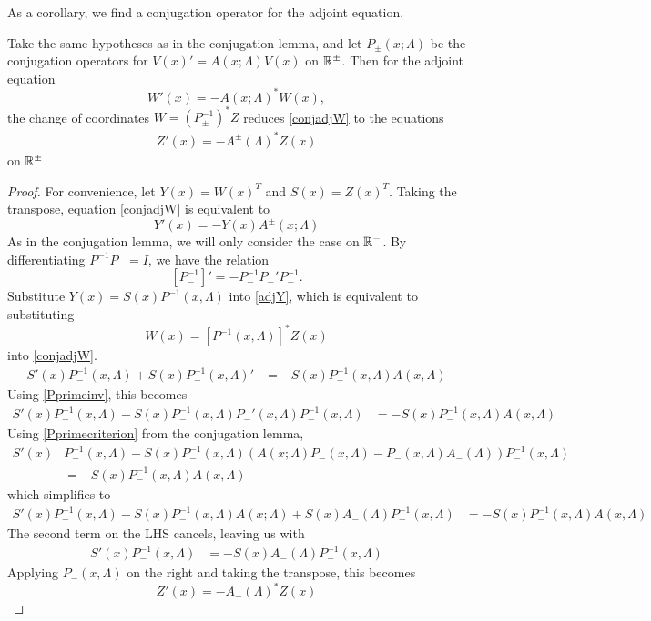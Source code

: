 \documentclass[thesis.tex]{subfiles}
\begin{document}
As a corollary, we find a conjugation operator for the adjoint equation.

\begin{corollary}\label{corr:adjconj}
Take the same hypotheses as in the conjugation lemma, and let $P_\pm(x; \Lambda)$ be the conjugation operators for $V(x)' = A(x; \Lambda) V(x)$ on $\mathbb{R}^\pm$. Then for the adjoint equation
\begin{equation}\label{conjadjW}
W'(x) = -A(x; \Lambda)^* W(x),
\end{equation}
the change of coordinates $W = (P_\pm^{-1})^* Z$ reduces \cref{conjadjW} to the equations
\begin{align}\label{ZconjW}
Z'(x) = -A^\pm(\Lambda)^* Z(x) 
\end{align}
on $\mathbb{R}^\pm$.
\begin{proof}
For convenience, let $Y(x) = W(x)^T$ and $S(x) = Z(x)^T$. Taking the transpose, equation \cref{conjadjW} is equivalent to
\begin{equation}\label{adjY}
Y'(x) = -Y(x)A^\pm(x; \Lambda) 
\end{equation}
As in the conjugation lemma, we will only consider the case on $\mathbb{R}^-$. By differentiating $P_-^{-1} P_- = I$, we have the relation
\begin{equation}\label{Pprimeinv}
[P_-^{-1}]' = -P_-^{-1} P_-' P_-^{-1}.
\end{equation}
Substitute $Y(x) = S(x) P^{-1}(x, \Lambda)$ into \cref{adjY}, which is equivalent to substituting 
\[
W(x) = [P^{-1}(x, \Lambda)]^* Z(x)
\] 
into \cref{conjadjW}.
\begin{align*}
S'(x) P_-^{-1}(x, \Lambda) + S(x) P_-^{-1}(x, \Lambda)'
&= -S(x) P_-^{-1}(x, \Lambda) A(x, \Lambda)
\end{align*}
Using \cref{Pprimeinv}, this becomes
\begin{align*}
S'(x) P_-^{-1}(x, \Lambda) - S(x) P_-^{-1}(x, \Lambda) P_-'(x, \Lambda) P_-^{-1}(x, \Lambda)
&= -S(x) P_-^{-1}(x, \Lambda) A(x, \Lambda)
\end{align*}
Using \cref{Pprimecriterion} from the conjugation lemma, 
\begin{align*}
S'(x) &P_-^{-1}(x, \Lambda) - S(x) P_-^{-1}(x, \Lambda) \left(A(x; \Lambda)P_-(x, \Lambda) - P_-(x, \Lambda) A_-(\Lambda)\right) P_-^{-1}(x, \Lambda) \\
&= -S(x) P_-^{-1}(x, \Lambda) A(x, \Lambda)
\end{align*}
which simplifies to
\begin{align*}
S'(x) P_-^{-1}(x, \Lambda) - S(x) P_-^{-1}(x, \Lambda) A(x; \Lambda) + S(x) A_-(\Lambda) P_-^{-1}(x, \Lambda)
&= -S(x) P_-^{-1}(x, \Lambda) A(x, \Lambda)
\end{align*}
The second term on the LHS cancels, leaving us with
\begin{align*}
S'(x) P_-^{-1}(x, \Lambda) &= -S(x) A_-(\Lambda) P_-^{-1}(x, \Lambda)
\end{align*}
Applying $P_-(x, \Lambda)$ on the right and taking the transpose, this becomes
\[
Z'(x) = -A_-(\Lambda)^* Z(x)
\]
\end{proof}
\end{corollary}
\end{document}
